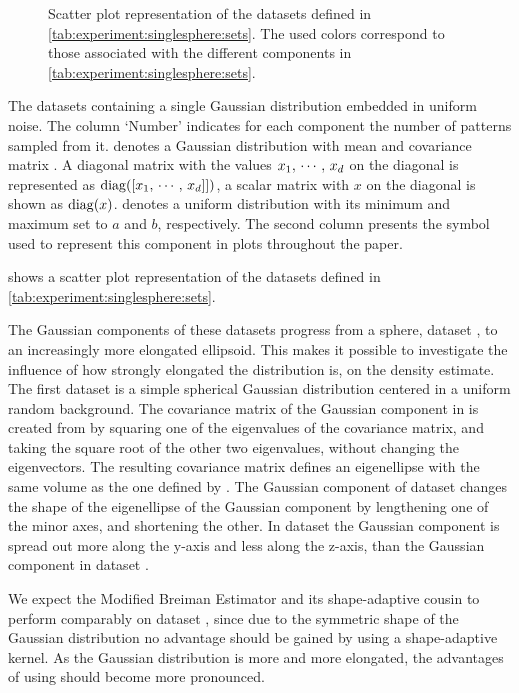 
\begin{figure*}
	\centering
	
	\caption{Scatter plot representation of the datasets defined in \cref{tab:experiment:singlesphere:sets}. The used colors correspond to those associated with the different components in \cref{tab:experiment:singlesphere:sets}.}
	\label{fig:experiment:singlesphere:sets}
\end{figure*}

\begin{table*}
	\centering
	
	\caption{The datasets containing a single Gaussian distribution embedded in uniform noise. The column `Number' indicates for each component the number of patterns sampled from it. \gaussDist{\varMean}{\varCovarianceMatrix} denotes a Gaussian distribution with mean \varMean and covariance matrix \varCovarianceMatrix. A diagonal matrix with the values $x_1,\, \cdots,\, x_d$ on the diagonal is represented as $\operatorname{diag}([x_1,\,\cdots,\,x_d]])$, a scalar matrix with $x$ on the diagonal is shown as $\operatorname{diag}(x)$.  denotes a uniform distribution with its minimum and maximum set to $a$ and $b$, respectively. The second column presents the symbol used to represent this component in plots throughout the paper.} 	
	\label{tab:experiment:singlesphere:sets}
\end{table*}

 shows a scatter plot representation of the datasets defined in \cref{tab:experiment:singlesphere:sets}. 

The Gaussian components of these datasets progress from a sphere, \ie dataset \ferdosiOne, to an increasingly more elongated ellipsoid. This makes it possible to investigate the influence of how strongly elongated the distribution is, on the density estimate. 
	The first dataset is a simple spherical Gaussian distribution centered in a uniform random background. 
	The covariance matrix of the Gaussian component in \baakmanOne is created from \ferdosiOne by squaring one of the eigenvalues of the covariance matrix, and taking the square root of the other two eigenvalues, without changing the eigenvectors. The resulting covariance matrix defines an eigenellipse with the same volume as the one defined by \ferdosiOne.
	The Gaussian component of dataset \baakmanFour changes the shape of the eigenellipse of the Gaussian component by lengthening one of the minor axes, and shortening the other.
	In dataset \baakmanFive the Gaussian component is spread out more along the y-axis and less along the z-axis, than the Gaussian component in dataset \baakmanFour.

	We expect the Modified Breiman Estimator and its shape-adaptive cousin to perform comparably on dataset \ferdosiOne, since due to the symmetric shape of the Gaussian distribution no advantage should be gained by using a shape-adaptive kernel. 
	As the Gaussian distribution is more and more elongated, the advantages of using \sambe should become more pronounced. 